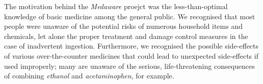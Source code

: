The motivation behind the \textit{Medaware} proejct was the less-than-optimal knowledge of basic medicine
among the general public. We recognised that most people were unaware of the potential risks of numerous household
items and chemicals, let alone the proper treatment and damage control measures in the case of
inadvertent ingestion. Furthermore, we recognised the possible side-effects of various over-the-counter medicines
that could lead to unexpected side-effects if used improperly; many are unaware of the serious, life-threatening
consequences of combining \textit{ethanol} and \textit{acetaminophen}, for example.
